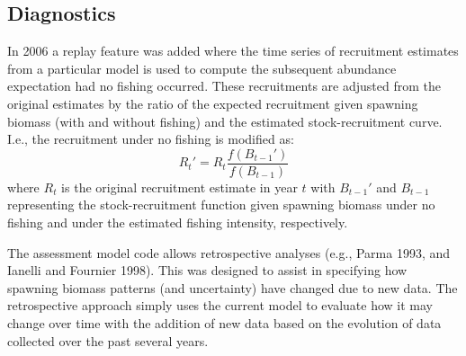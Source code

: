 \documentclass[11pt,
  english,
  a4paper,
]{article}
\begin{document}
\leavevmode\tagmcend\tagstructend\par


\hypertarget{diagnostics}{%
\subsection{Diagnostics}\label{diagnostics}}

\leavevmode\tagmcend\tagstructend


In 2006 a replay feature was added where the time series of recruitment estimates from a particular model is used to compute the subsequent abundance expectation had no fishing occurred. These recruitments are adjusted from the original estimates by the ratio of the expected recruitment given spawning biomass (with and without fishing) and the estimated stock-recruitment curve. I.e., the recruitment under no fishing is modified as: {\[R_t' = \hat{R}_t\frac{f(B_{t-1}')}{f(B_{t-1})}\]\leavevmode\tagmcend\tagstructend} where {\(R_t\)\leavevmode\tagmcend\tagstructend} is the original recruitment estimate in year {\(t\)\leavevmode\tagmcend\tagstructend} with {\(B_{t-1}'\)\leavevmode\tagmcend\tagstructend} and {\(B_{t-1}\)\leavevmode\tagmcend\tagstructend} representing the stock-recruitment function given spawning biomass under no fishing and under the estimated fishing intensity, respectively.

\leavevmode\tagmcend\tagstructend\par


The assessment model code allows retrospective analyses (e.g., Parma 1993, and Ianelli and Fournier 1998). This was designed to assist in specifying how spawning biomass patterns (and uncertainty) have changed due to new data. The retrospective approach simply uses the current model to evaluate how it may change over time with the addition of new data based on the evolution of data collected over the past several years.

\leavevmode\tagmcend\tagstructend\par
\end{document}
